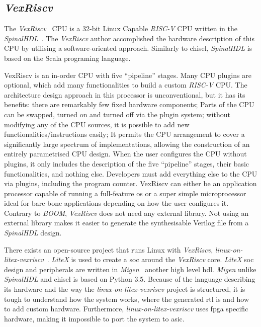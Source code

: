 \subsection{\textit{VexRiscv}}
The \textit{VexRiscv}~\cite{vexriscv} CPU is a 32-bit Linux Capable \textit{RISC-V} CPU written in the \textit{SpinalHDL}~\cite{papon2017spinalhdl}. The \textit{VexRiscv} author accomplished the hardware description of this CPU by utilising a software-oriented approach. Similarly to \acrshort{chisel}, \textit{SpinalHDL} is based on the Scala programing language.

VexRiscv is an in-order CPU with five \enquote{pipeline} stages. Many CPU plugins are optional, which add many functionalities to build a custom \textit{RISC-V} CPU. The architecture design approach in this processor is unconventional, but it has its benefits: there are remarkably few fixed hardware components; Parts of the CPU can be swapped, turned on and turned off via the plugin system; without modifying any of the CPU sources, it is possible to add new functionalities/instructions easily; It permits the CPU arrangement to cover a significantly large spectrum of implementations, allowing the construction of an entirely parametrised CPU design. When the user configures the CPU without plugins, it only includes the description of the five \enquote{pipeline} stages, their basic functionalities, and nothing else. Developers must add everything else to the CPU via plugins, including the program counter. VexRiscv can either be an application processor capable of running a full-feature \acrfull{os} or a super simple microprocessor ideal for bare-bone applications depending on how the user configures it. Contrary to \textit{BOOM}, \textit{VexRiscv} does not need any external library. Not using an external library makes it easier to generate the synthesisable Verilog file from a \textit{SpinalHDL} design.

There exists an open-source project that runs Linux with \textit{VexRiscv}, \textit{linux-on-litex-vexriscv}~\cite{litex_vexriscv}. \textit{LiteX} is used to create a \acrfull{soc} around the \textit{VexRiscv} core. \textit{LiteX} \acrshort{soc} design and peripherals are written in \textit{Migen}~\cite{bourdeauducq2012migen} another high level \acrshort{hdl}. \textit{Migen} unlike \textit{SpinalHDL} and  \acrshort{chisel} is based on Python 3.5. Because of the language describing its hardware and the way the \textit{linux-on-litex-vexriscv} project is structured, it is tough to understand how the system works, where the generated \acrshort{rtl} is and how to add custom hardware. Furthermore, \textit{linux-on-litex-vexriscv} uses \acrshort{fpga} specific hardware, making it impossible to port the system to \acrshort{asic}.

